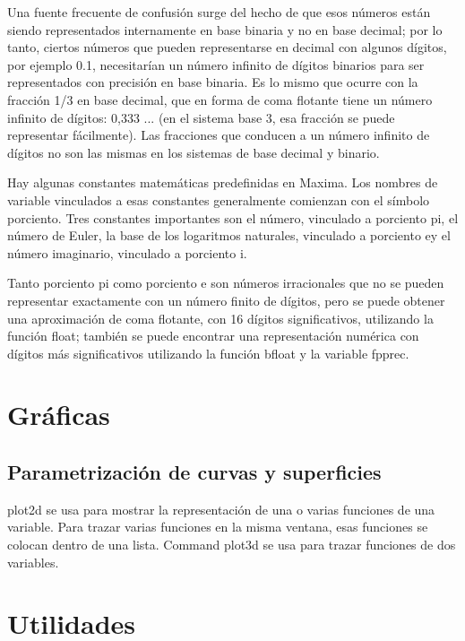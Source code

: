 \documentclass{article}
\begin{document}
Una fuente frecuente de confusión surge del hecho de que esos números están siendo representados internamente en base binaria y no en base decimal; por lo tanto, ciertos números que pueden representarse en decimal con algunos dígitos, por ejemplo 0.1, necesitarían un número infinito de dígitos binarios para ser representados con precisión en base binaria. Es lo mismo que ocurre con la fracción 1/3 en base decimal, que en forma de coma flotante tiene un número infinito de dígitos: 0,333 ... (en el sistema base 3, esa fracción se puede representar fácilmente). Las fracciones que conducen a un número infinito de dígitos no son las mismas en los sistemas de base decimal y binario.

Hay algunas constantes matemáticas predefinidas en Maxima. Los nombres de variable vinculados a esas constantes generalmente comienzan con el símbolo porciento. Tres constantes importantes son el número, vinculado a porciento pi, el número de Euler, la base de los logaritmos naturales, vinculado a porciento ey el número imaginario, vinculado a porciento i.

Tanto porciento pi como porciento e son números irracionales que no se pueden representar exactamente con un número finito de dígitos, pero se puede obtener una aproximación de coma flotante, con 16 dígitos significativos, utilizando la función float; también se puede encontrar una representación numérica con dígitos más significativos utilizando la función bfloat y la variable fpprec.






\section{Gráficas}

\subsection{Parametrización de curvas y superficies}

plot2d se usa para mostrar la representación de una o varias funciones de una variable.
Para trazar varias funciones en la misma ventana, esas funciones se colocan dentro de una lista. Command plot3d se usa para trazar funciones de dos variables.



\section{Utilidades}
\end{document}
